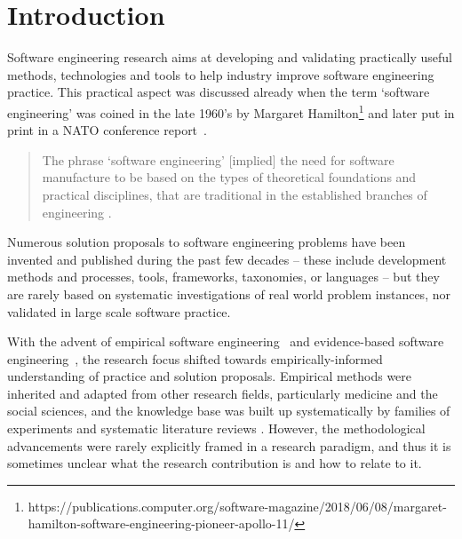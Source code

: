 \documentclass[graybox]{svmult}
\begin{document}
\section{Introduction}
\label{sec:intro}

Software engineering research aims at developing and validating practically useful methods, technologies and tools to help industry improve software engineering practice. This practical aspect was discussed already when the term `software engineering' was coined in the late 1960's by Margaret Hamilton\footnote{https://publications.computer.org/software-magazine/2018/06/08/margaret-hamilton-software-engineering-pioneer-apollo-11/} and later put in print in a NATO conference report~\cite{Nato1968}. 

\begin{quote}
{The phrase `software engineering'  [implied] the need for software manufacture to be based on the types of theoretical foundations and practical disciplines, that are traditional in the established branches of engineering} \cite[p. 13]{Nato1968}. 
\end{quote}

Numerous solution proposals to software engineering problems have been invented and published during the past few decades -- these include development methods and processes, tools, frameworks, taxonomies, or languages -- but they are rarely based on systematic investigations of real world problem instances, nor validated in large scale software practice.

With the advent of empirical software engineering~\cite{Basili86} and evidence-based software engineering~\cite{Kitchenham04}, the research focus shifted towards  empirically-informed understanding of practice and solution proposals. Empirical methods were inherited and adapted from other research fields, particularly medicine and the social sciences, and the knowledge base was built up systematically by families of experiments \cite{Basili99} and systematic literature reviews \cite{Kitchenham15}. However, the methodological advancements were rarely explicitly framed in a research paradigm, and thus it is sometimes unclear what the research contribution is and how to relate to it. 
\end{document}
